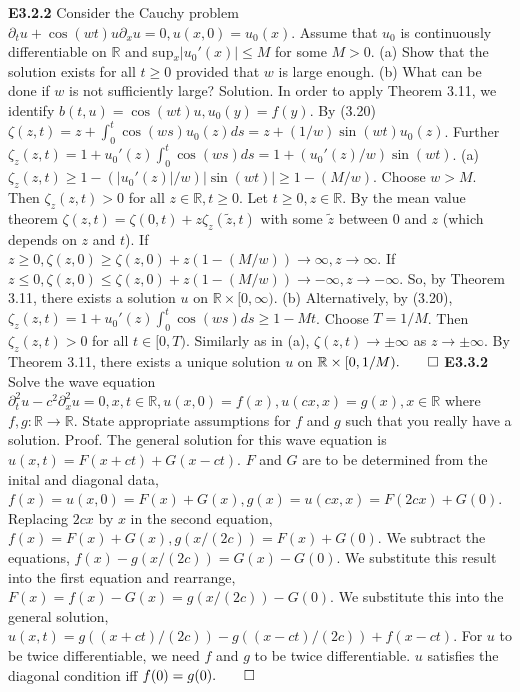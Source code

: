 \documentclass[6pt]{article}
\newcommand{\R}{\mathbb{R}}
\newcommand{\ra}{\rightarrow}
\begin{document}
\begin{multicols}{2}
{\bf E3.2.2} Consider the Cauchy problem $\partial_tu+\cos(wt)u\partial_xu=0, u(x,0)=u_0(x)$. Assume that $u_0$ is continuously differentiable on $\R$ and sup$_x|u_0'(x)|\leq M$ for some $M>0$. (a) Show that the solution exists for all $t \geq 0$ provided that $w$ is large enough. (b) What can be done if $w$ is not sufficiently large?  Solution.  In order to apply Theorem 3.11, we identify $b(t,u)=\cos(wt)u, u_0(y)=f(y)$. By (3.20) $\zeta(z,t)=z + \int_0^t \cos(ws)u_0(z)ds=z+(1/w)\sin(wt)u_0(z)$. Further $\zeta_z(z,t)=1+u_0'(z)\int_0^t \cos (ws)ds=1+(u_0'(z)/w)\sin(wt)$. (a) $\zeta_z(z,t)\geq 1 - (|u_0'(z)|/w)|\sin(wt)|\geq 1-(M/w)$. Choose $w > M$. Then $\zeta_z(z,t)>0$ for all $z \in \R, t \geq 0$. Let $t \geq 0, z \in \R$. By the mean value theorem $\zeta (z,t)=\zeta(0,t)+z\zeta_z(\tilde{z},t)$ with some $\tilde{z}$ between 0 and $z$ (which depends on $z$ and $t$). If $z \geq 0, \zeta(z,0)\geq \zeta(z,0)+z(1-(M/w))\ra \infty, z \ra \infty$. If $z \leq 0, \zeta(z,0)\leq \zeta(z,0)+z(1-(M/w))\ra -\infty, z \ra -\infty$. So, by Theorem 3.11, there exists a solution $u$ on $\R \times [0,\infty)$. (b) Alternatively, by (3.20), $\zeta_z(z,t)=1+u_0'(z)\int_0^t \cos (ws)ds\geq 1-Mt$. Choose $T = 1/M$. Then $\zeta_z(z,t)>0$ for all $t \in [0,T)$. Similarly as in (a), $\zeta(z,t)\ra \pm \infty$ as $z \ra \pm \infty$. By Theorem 3.11, there exists a unique solution $u$ on $\R \times [0,1/M). \qed$
{\bf E3.3.2} Solve the wave equation $\partial_t^2u-c^2\partial_x^2u=0, x,t \in \R, u(x,0)=f(x), u(cx,x)=g(x), x\in \R$ where $f,g: \R \ra \R$. State appropriate assumptions for $f$ and $g$ such that you really have a solution.  Proof. The general solution for this wave equation is $u(x,t)=F(x+ct)+G(x-ct)$. $F$ and $G$ are to be determined from the inital and diagonal data, $f(x)=u(x,0)=F(x)+G(x), g(x)=u(cx,x)=F(2cx)+G(0)$. Replacing $2cx$ by $x$ in the second equation, $f(x)=F(x)+G(x), g(x/(2c))=F(x)+G(0)$. We subtract the equations, $f(x)-g(x/(2c))=G(x)-G(0)$. We substitute this result into the first equation and rearrange, $F(x)=f(x)-G(x)=g(x/(2c))-G(0)$. We substitute this into the general solution, $u(x,t)=g((x+ct)/(2c))-g((x-ct)/(2c))+f(x-ct)$. For $u$ to be twice differentiable, we need $f$ and $g$ to be twice differentiable.  $u$ satisfies the diagonal condition iff $f(0)=g(0). \qed$

\end{multicols}
\end{document}
